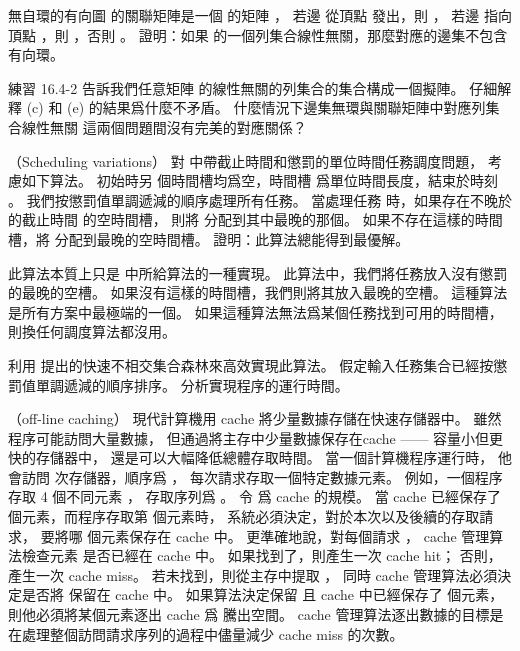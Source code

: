 \startANSWER
\TODO{}
\stopANSWER

\startitem
無自環的有向圖  的{\EMP 關聯矩陣}是一個  的矩陣 ，
若邊  從頂點  發出，則 ，
若邊  指向頂點 ，則 ，否則 。
證明：如果  的一個列集合線性無關，那麼對應的邊集不包含有向環。
\stopitem

\startANSWER
\TODO{}
\stopANSWER

\startitem
練習 16.4-2 告訴我們任意矩陣  的線性無關的列集合的集合構成一個擬陣。
仔細解釋 (c) 和 (e) 的結果爲什麼不矛盾。
什麼情況下邊集無環與關聯矩陣中對應列集合線性無關
這兩個問題間沒有完美的對應關係？
\stopitem

\startANSWER
\TODO{}
\stopANSWER
\stopigBase
\stopPROBLEM%

\startPROBLEM
（Scheduling variations）
對 中帶截止時間和懲罰的單位時間任務調度問題，
考慮如下算法。
初始時另  個時間槽均爲空，時間槽  爲單位時間長度，結束於時刻 。
我們按懲罰值單調遞減的順序處理所有任務。
當處理任務  時，如果存在不晚於  的截止時間  的空時間槽，
則將  分配到其中最晚的那個。
如果不存在這樣的時間槽，將  分配到最晚的空時間槽。
\startigBase[a]
\startitem
證明：此算法總能得到最優解。
\stopitem

\startANSWER
此算法本質上只是 中所給算法的一種實現。
此算法中，我們將任務放入沒有懲罰的最晚的空槽。
如果沒有這樣的時間槽，我們則將其放入最晚的空槽。
這種算法是所有方案中最極端的一個。
如果這種算法無法爲某個任務找到可用的時間槽，則換任何調度算法都沒用。
\stopANSWER

\startitem
利用 提出的快速不相交集合森林來高效實現此算法。
假定輸入任務集合已經按懲罰值單調遞減的順序排序。
分析實現程序的運行時間。
\stopitem

\startANSWER
\TODO{}
\stopANSWER
\stopigBase
\stopPROBLEM

\startPROBLEM
（off-line caching）
現代計算機用 cache 將少量數據存儲在快速存儲器中。
雖然程序可能訪問大量數據，
但通過將主存中少量數據保存在{\EMP cache} —— 容量小但更快的存儲器中，
還是可以大幅降低總體存取時間。
當一個計算機程序運行時，
他會訪問  次存儲器，順序爲 ，
每次請求存取一個特定數據元素。
例如，一個程序存取 4 個不同元素 ，
存取序列爲 。
令  爲 cache 的規模。
當 cache 已經保存了  個元素，而程序存取第  個元素時，
系統必須決定，對於本次以及後續的存取請求，
要將哪  個元素保存在 cache 中。
更準確地說，對每個請求 ， cache 管理算法檢查元素  是否已經在 cache 中。
如果找到了，則產生一次 {\EMP cache hit}；
否則，產生一次 {\EMP cache miss}。
若未找到，則從主存中提取 ，
同時 cache 管理算法必須決定是否將  保留在 cache 中。
如果算法決定保留  且 cache 中已經保存了  個元素，
則他必須將某個元素逐出 cache 爲  騰出空間。
 cache 管理算法逐出數據的目標是在處理整個訪問請求序列的過程中儘量減少 cache miss 的次數。

